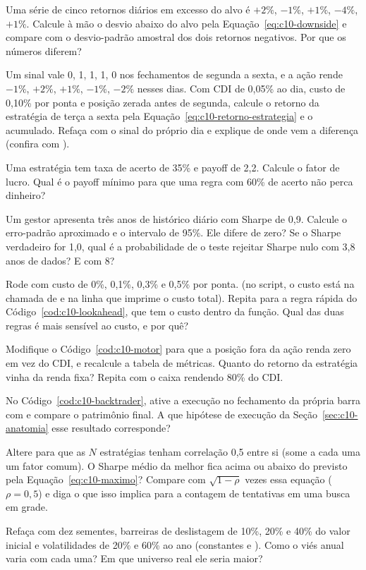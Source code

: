 \begin{exercicios}
  \item {} Uma série de cinco retornos diários em excesso do alvo é $+2\%$, $-1\%$, $+1\%$, $-4\%$, $+1\%$. Calcule à mão o desvio abaixo do alvo pela Equação~\eqref{eq:c10-downside} e compare com o desvio-padrão amostral dos dois retornos negativos. Por que os números diferem?
  \item {} Um sinal vale 0, 1, 1, 1, 0 nos fechamentos de segunda a sexta, e a ação rende $-1\%$, $+2\%$, $+1\%$, $-1\%$, $-2\%$ nesses dias. Com CDI de 0,05\% ao dia, custo de 0,10\% por ponta e posição zerada antes de segunda, calcule o retorno da estratégia de terça a sexta pela Equação~\eqref{eq:c10-retorno-estrategia} e o acumulado. Refaça com o sinal do próprio dia e explique de onde vem a diferença (confira com ).
  \item {} Uma estratégia tem taxa de acerto de 35\% e payoff de 2,2. Calcule o fator de lucro. Qual é o payoff mínimo para que uma regra com 60\% de acerto não perca dinheiro?
  \item {} Um gestor apresenta três anos de histórico diário com Sharpe de 0,9. Calcule o erro-padrão aproximado e o intervalo de 95\%. Ele difere de zero? Se o Sharpe verdadeiro for 1,0, qual é a probabilidade de o teste rejeitar Sharpe nulo com 3,8 anos de dados? E com 8?
  \item {} Rode  com custo de 0\%, 0,1\%, 0,3\% e 0,5\% por ponta. (no script, o custo está na chamada de  e na linha que imprime o custo total). Repita para a regra rápida do Código~\ref{cod:c10-lookahead}, que tem o custo dentro da função. Qual das duas regras é mais sensível ao custo, e por quê?
  \item {} Modifique o Código~\ref{cod:c10-motor} para que a posição fora da ação renda zero em vez do CDI, e recalcule a tabela de métricas. Quanto do retorno da estratégia vinha da renda fixa? Repita com o caixa rendendo 80\% do CDI.
  \item {} No Código~\ref{cod:c10-backtrader}, ative a execução no fechamento da própria barra com  e compare o patrimônio final. A que hipótese de execução da Seção~\ref{sec:c10-anatomia} esse resultado corresponde?
  \item {} Altere  para que as $N$ estratégias tenham correlação 0,5 entre si (some a cada uma um fator comum). O Sharpe médio da melhor fica acima ou abaixo do previsto pela Equação~\eqref{eq:c10-maximo}? Compare com $\sqrt{1-\rho}$ vezes essa equação ($\rho = 0,5$) e diga o que isso implica para a contagem de tentativas em uma busca em grade.
  \item {} Refaça  com dez sementes, barreiras de deslistagem de 10\%, 20\% e 40\% do valor inicial e volatilidades de 20\% e 60\% ao ano (constantes  e ). Como o viés anual varia com cada uma? Em que universo real ele seria maior?
\end{exercicios}

